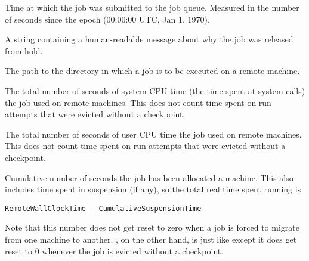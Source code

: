 \begin{description}
\item[\AdAttr{QDate}:]  Time at which the job was submitted to the job
queue.  Measured in the
number of seconds since the epoch (00:00:00 UTC, Jan 1, 1970).

\item[\AdAttr{ReleaseReason}:]     A string containing a human-readable
message about why the job was released from hold.

\item[\AdAttr{RemoteIwd}:]  The path to the directory in which
a job is to be executed on a remote machine.

\item[\AdAttr{RemoteSysCpu}:]  The total number of seconds
of system CPU time (the time spent at system calls) the job used
on remote machines.  This does not count time spent on run attempts that
were evicted without a checkpoint.

\item[\AdAttr{RemoteUserCpu}:]  The total number of seconds
of user CPU time the job used on remote machines.  This does not
count time spent on run attempts that were evicted without a checkpoint.


\label{RemoteWallClockTime}
\item[\AdAttr{RemoteWallClockTime}:]  Cumulative number of seconds
the job has been allocated a machine.
This also includes time spent in suspension (if any),
so the total real time spent running is 
\begin{verbatim}
RemoteWallClockTime - CumulativeSuspensionTime
\end{verbatim}
Note that this number does not get reset to
zero when a job is forced to migrate from one machine to another.
, on the other hand, is just like
 except it does get reset to 0 whenever
the job is evicted without a checkpoint.


\end{description}
